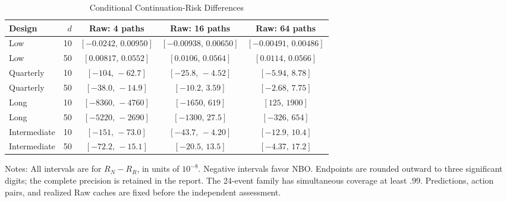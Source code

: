 \begin{table}[htbp]\centering
\caption{Conditional Continuation-Risk Differences}\label{tab:r18risk}
\small\setlength{\tabcolsep}{4pt}
\begin{tabular}{lrccc}\toprule
Design & $d$ & Raw: 4 paths & Raw: 16 paths & Raw: 64 paths\\\midrule
Low & 10 & $[-0.0242,\,0.00950]$ & $[-0.00938,\,0.00650]$ & $[-0.00491,\,0.00486]$\\
Low & 50 & $[0.00817,\,0.0552]$ & $[0.0106,\,0.0564]$ & $[0.0114,\,0.0566]$\\
Quarterly & 10 & $[-104,\,-62.7]$ & $[-25.8,\,-4.52]$ & $[-5.94,\,8.78]$\\
Quarterly & 50 & $[-38.0,\,-14.9]$ & $[-10.2,\,3.59]$ & $[-2.68,\,7.75]$\\
Long & 10 & $[-8360,\,-4760]$ & $[-1650,\,619]$ & $[125,\,1900]$\\
Long & 50 & $[-5220,\,-2690]$ & $[-1300,\,27.5]$ & $[-326,\,654]$\\
Intermediate & 10 & $[-151,\,-73.0]$ & $[-43.7,\,-4.20]$ & $[-12.9,\,10.4]$\\
Intermediate & 50 & $[-72.2,\,-15.1]$ & $[-20.5,\,13.5]$ & $[-4.37,\,17.2]$\\
\bottomrule\end{tabular}
\par\vspace{4pt}\begin{minipage}{.97\textwidth}\footnotesize
Notes: All intervals are for $R_N-R_R$, in units of $10^{-8}$. Negative intervals favor NBO. Endpoints are rounded outward to three significant digits; the complete precision is retained in the report. The 24-event family has simultaneous coverage at least $.99$. Predictions, action pairs, and realized Raw caches are fixed before the independent assessment.
\end{minipage}\end{table}
